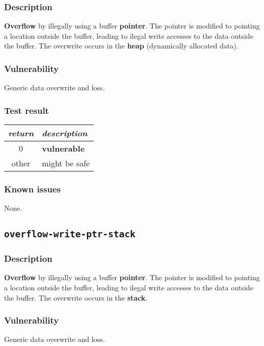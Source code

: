 \documentclass[a4paper]{book}
\begin{document}
\subsubsection{Description}

\textbf{Overflow} by illegally using a buffer \textbf{pointer}.
The pointer is modified to pointing a location outside the buffer,
leading to ilegal write accesses to the data outside the buffer.
The overwrite occurs in the \textbf{heap} (dynamically allocated data).

\subsubsection{Vulnerability}
Generic data overwrite and loss.

\subsubsection{Test result}

\begin{tabular}{cl}
  \toprule
  \emph{return}  & \emph{description} \\
  \midrule
  0              & \textbf{vulnerable} \\
  other          & might be safe \\
  \bottomrule
\end{tabular}

\subsubsection{Known issues}

None.

\newpage

\subsection{\texttt{overflow-write-ptr-stack}}\label{test-overflow-write-ptr-stack}

\subsubsection{Description}

\textbf{Overflow} by illegally using a buffer \textbf{pointer}.
The pointer is modified to pointing a location outside the buffer,
leading to ilegal write accesses to the data outside the buffer.
The overwrite occurs in the \textbf{stack}.

\subsubsection{Vulnerability}
Generic data overwrite and loss.
\end{document}
